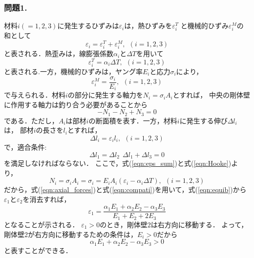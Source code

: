 ﻿\documentclass[10pt,a4j]{jarticle}
\begin{document}
\subsubsection*{問題1.}
材料$i(=1,2,3)$に発生するひずみは$\varepsilon_i$は，熱ひずみを$\varepsilon_i^T$
と機械的ひずみ$\varepsilon_i^M$の和として
\begin{equation}
	\varepsilon_i =
	\varepsilon_i^T 
	+
	\varepsilon_i^M, \ \ (i=1,2,3) 
	\label{eqn:eps_sum}
\end{equation}
と表される．熱歪みは，線膨張係数$\alpha_i$と$\Delta T$を用いて
\begin{equation}
	\varepsilon_i^T= \alpha_i \Delta T, \ \ (i=1,2,3)
\end{equation}
と表される.一方，機械的ひずみは，ヤング率$E_i$と応力$\sigma_i$により，
\begin{equation}
	\varepsilon_i^M= \frac{\sigma_i}{E_i}, \ \ (i=1,2,3)
	\label{eqn:Hooke}
\end{equation}
で与えられる．材料$i$の部分に発生する軸力を$N_i=\sigma_i A_i$とすれば，
中央の剛体壁に作用する軸力は釣り合う必要があることから
\begin{equation}
	-N_1-N_2+N_3=0 
	\label{eqn:equib}
\end{equation}
である．ただし，$A_i$は部材$i$の断面積を表す．一方，材料$i$に発生する伸び$\Delta l_i$は，
部材$i$の長さを$l_i$とすれば，
\begin{equation}
	\Delta l_i = \varepsilon_i l_i, \ \ (i=1,2,3) 
\end{equation}
で，適合条件:
\begin{equation}
	\Delta l_1=\Delta l_2 \ \ \Delta l_1+\Delta l_3=0
	\label{eqn:compati}
\end{equation}
を満足しなければならない．
ここで，式(\ref{eqn:eps_sum})と式(\ref{eqn:Hooke})より，
\begin{equation}
	N_i=\sigma_i A_i=\sigma_i=E_iA_i\left( \varepsilon_i-\alpha_i \Delta T\right), \ \ (i=1,2,3)
	\label{eqn:axial_forces}
\end{equation}
だから，式(\ref{eqn:axial_forces})と式(\ref{eqn:compati})を用いて，式(\ref{eqn:equib})から
$\varepsilon_1$と$\varepsilon_2$を消去すれば，
\begin{equation}
	\varepsilon_1=\frac{\alpha_1E_1+\alpha_2E_2-\alpha_3 E_3}{E_1+E_2+2E_3}
\end{equation}
となることが示される．
$\varepsilon_1>0$のとき，剛体壁2は右方向に移動する．
よって，剛体壁2が右方向に移動するための条件は，$E_i>0$だから
\begin{equation}
	\alpha_1E_1+\alpha_2E_2-\alpha_3 E_3 >0
\end{equation}
と表すことができる．
\end{document}

